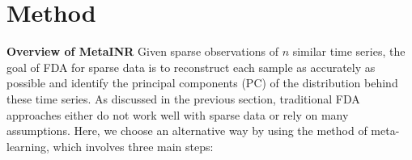\documentclass{article}
\begin{document}
\section{Method}
\textbf{Overview of MetaINR}
Given sparse observations of $n$ similar time series, the goal of FDA for sparse data is to reconstruct each sample as accurately as possible and identify the principal components (PC) of the distribution behind these time series.
As discussed in the previous section, traditional FDA approaches either do not work well with sparse data or rely on many assumptions.
Here, we choose an alternative way by using the method of meta-learning, which involves three main steps:
\end{document}
